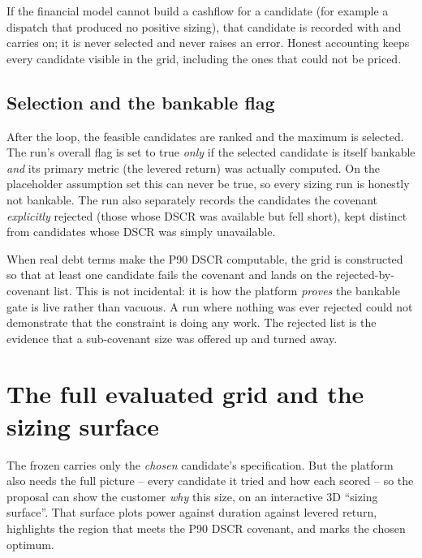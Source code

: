 \begin{caution}
If the financial model cannot build a cashflow for a candidate (for example a dispatch that produced no positive sizing), that candidate is recorded with  and carries on; it is never selected and never raises an error. Honest accounting keeps every candidate visible in the grid, including the ones that could not be priced.
\end{caution}

\subsection{Selection and the bankable flag}

After the loop, the feasible candidates are ranked and the maximum is selected. The run's overall  flag is set to true \emph{only} if the selected candidate is itself bankable \emph{and} its primary metric (the levered return) was actually computed. On the placeholder assumption set this can never be true, so every sizing run is honestly not bankable. The run also separately records the candidates the covenant \emph{explicitly} rejected (those whose DSCR was available but fell short), kept distinct from candidates whose DSCR was simply unavailable.

\begin{keyidea}
When real debt terms make the P90 DSCR computable, the grid is constructed so that at least one candidate fails the covenant and lands on the rejected-by-covenant list. This is not incidental: it is how the platform \emph{proves} the bankable gate is live rather than vacuous. A run where nothing was ever rejected could not demonstrate that the constraint is doing any work. The rejected list is the evidence that a sub-covenant size was offered up and turned away.
\end{keyidea}

\section{The full evaluated grid and the sizing surface}

The frozen  carries only the \emph{chosen} candidate's specification. But the platform also needs the full picture -- every candidate it tried and how each scored -- so the proposal can show the customer \emph{why} this size, on an interactive 3D ``sizing surface''. That surface plots power against duration against levered return, highlights the region that meets the P90 DSCR covenant, and marks the chosen optimum.

